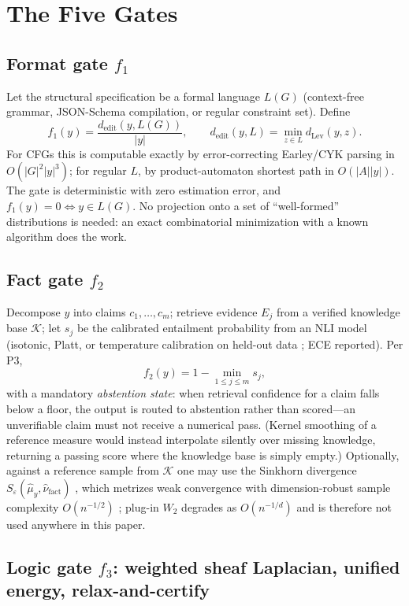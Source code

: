 \section{The Five Gates}
\label{sec:gates}

\subsection{Format gate $f_1$}

Let the structural specification be a formal language $L(G)$ (context-free
grammar, JSON-Schema compilation, or regular constraint set). Define
\[
f_1(y)=\frac{d_{\mathrm{edit}}(y,L(G))}{|y|},\qquad
d_{\mathrm{edit}}(y,L)=\min_{z\in L} d_{\mathrm{Lev}}(y,z).
\]
For CFGs this is computable exactly by error-correcting Earley/CYK parsing
\cite{aho1972} in $O(|G|^2|y|^3)$; for regular $L$, by product-automaton
shortest path in $O(|A||y|)$. The gate is deterministic with zero estimation
error, and $f_1(y)=0\iff y\in L(G)$. No projection onto a set of
``well-formed'' distributions is needed: an exact combinatorial minimization
with a known algorithm does the work.

\subsection{Fact gate $f_2$}

Decompose $y$ into claims $c_1,\dots,c_m$; retrieve evidence $E_j$ from a
verified knowledge base $\mathcal K$; let $s_j$ be the calibrated entailment
probability from an NLI model (isotonic, Platt, or temperature calibration on
held-out data \cite{guo2017}; ECE reported). Per P3,
\[
f_2(y)=1-\min_{1\le j\le m}s_j,
\]
with a mandatory \emph{abstention state}: when retrieval confidence for a
claim falls below a floor, the output is routed to abstention rather than
scored---an unverifiable claim must not receive a numerical pass. (Kernel
smoothing of a reference measure would instead interpolate silently over
missing knowledge, returning a passing score where the knowledge base is
simply empty.) Optionally, against a reference
sample from $\mathcal K$ one may use the Sinkhorn divergence
$S_\varepsilon(\hat\mu_y,\hat\nu_{\mathrm{fact}})$ \cite{cuturi2013}, which
metrizes weak convergence with dimension-robust sample complexity
$O(n^{-1/2})$
\cite{genevay2019}; plug-in $W_2$ degrades as $O(n^{-1/d})$ \cite{fournier2015}
and is therefore not used anywhere in this paper.

\subsection{Logic gate $f_3$: weighted sheaf Laplacian, unified energy,
relax-and-certify}
\label{sec:logic-gate}

